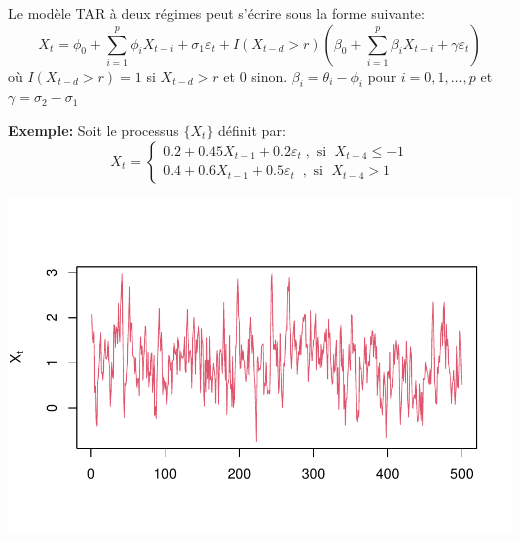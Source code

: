 \documentclass[
  french,
]{article}
\newenvironment{Shaded}{\begin{snugshade}}{\end{snugshade}}
\newcommand{\AttributeTok}[1]{\textcolor[rgb]{0.77,0.63,0.00}{#1}}
\newcommand{\DecValTok}[1]{\textcolor[rgb]{0.00,0.00,0.81}{#1}}
\newcommand{\FloatTok}[1]{\textcolor[rgb]{0.00,0.00,0.81}{#1}}
\newcommand{\FunctionTok}[1]{\textcolor[rgb]{0.00,0.00,0.00}{#1}}
\newcommand{\NormalTok}[1]{#1}
\newcommand{\OtherTok}[1]{\textcolor[rgb]{0.56,0.35,0.01}{#1}}
\newcommand{\SpecialCharTok}[1]{\textcolor[rgb]{0.00,0.00,0.00}{#1}}
\newcommand{\StringTok}[1]{\textcolor[rgb]{0.31,0.60,0.02}{#1}}
\begin{document}
Le modèle TAR à deux régimes peut s'écrire sous la forme suivante: \[
X_t=\phi_0+\displaystyle\sum_{i=1}^p\phi_iX_{t-i}+\sigma_1\varepsilon_t+I(X_{t-d} > r)\left(\beta_0+\displaystyle\sum_{i=1}^p\beta_iX_{t-i}+\gamma\varepsilon_t \right)
\] où \(I(X_{t-d} > r)=1\) si \(X_{t-d} > r\) et \(0\) sinon.
\(\beta_i=\theta_i-\phi_i\) pour \(i=0,1,\ldots,p\) et
\(\gamma=\sigma_2-\sigma_1\)

\textbf{Exemple:} Soit le processus \(\{X_t\}\) définit par: \[
X_t=\begin{cases}
0.2+0.45X_{t-1}+0.2\varepsilon_t \;,\text{ si }\; X_{t-4} \leq -1\\
0.4+0.6X_{t-1}+0.5\varepsilon_t \;\;,\text{ si }\; X_{t-4} > 1
\end{cases}
\]

\begin{Shaded}
\end{Shaded}

\begin{center}\includegraphics{Chap3_files/figure-latex/tar1-1} \end{center}
\end{document}
